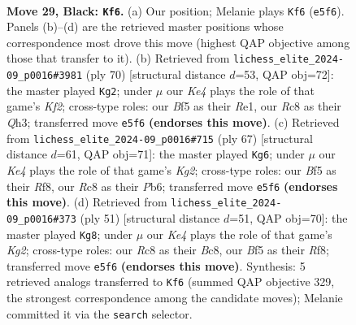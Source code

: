\documentclass[11pt]{article}
\begin{document}
\clearpage

\begin{figure}[p]\centering
\begin{subfigure}{0.46\textwidth}\centering
\resizebox{\linewidth}{!}{%
\newchessgame
\chessboard[
  setfen={1rr5/7p/1p6/p3kb2/7P/N3Q3/PP3PP1/R5K1 b - - 6 29},
  showmover=false,
  pgfstyle=straightmove, color=movearrow, markmove={e5-f6}
]}
\caption{}
\end{subfigure}\hfill
\begin{subfigure}{0.46\textwidth}\centering
\resizebox{\linewidth}{!}{%
\newchessgame
\chessboard[
  setfen={2r5/p4k2/1p2pp2/8/3n1qP1/7Q/PP3K2/4R1R1 w - - 1 36},
  showmover=false,
  pgfstyle=straightmove, color=movearrow, markmove={f2-g2}
]}
\caption{}
\end{subfigure}
\\[4pt]
\begin{subfigure}{0.46\textwidth}\centering
\resizebox{\linewidth}{!}{%
\newchessgame
\chessboard[
  setfen={3r1r2/p5k1/1p6/3pQ3/8/4P3/PP3P1P/7K b - - 5 34},
  showmover=false,
  pgfstyle=straightmove, color=movearrow, markmove={g7-g6}
]}
\caption{}
\end{subfigure}\hfill
\begin{subfigure}{0.46\textwidth}\centering
\resizebox{\linewidth}{!}{%
\newchessgame
\chessboard[
  setfen={2b2r2/pr4k1/1p6/4Q3/4R3/P7/1P3P1P/6K1 b - - 0 26},
  showmover=false,
  pgfstyle=straightmove, color=movearrow, markmove={g7-g8}
]}
\caption{}
\end{subfigure}
\caption{\textbf{Move 29, Black: \texttt{Kf6}.} (a) Our position; Melanie plays \texttt{Kf6} (\texttt{e5f6}). Panels (b)--(d) are the retrieved master positions whose correspondence most drove this move (highest QAP objective among those that transfer to it). (b) Retrieved from \texttt{lichess\_elite\_2024-09\_p0016\#3981} (ply 70) [structural distance $d$=53, QAP obj=72]: the master played \texttt{Kg2}; under $\mu$ our \emph{Ke4} plays the role of that game's \emph{Kf2}; cross-type roles: our \emph{B}f5 as their \emph{R}e1, our \emph{R}c8 as their \emph{Q}h3; transferred move \texttt{e5f6} \textbf{(endorses this move)}. (c) Retrieved from \texttt{lichess\_elite\_2024-09\_p0016\#715} (ply 67) [structural distance $d$=61, QAP obj=71]: the master played \texttt{Kg6}; under $\mu$ our \emph{Ke4} plays the role of that game's \emph{Kg2}; cross-type roles: our \emph{B}f5 as their \emph{R}f8, our \emph{R}c8 as their \emph{P}b6; transferred move \texttt{e5f6} \textbf{(endorses this move)}. (d) Retrieved from \texttt{lichess\_elite\_2024-09\_p0016\#373} (ply 51) [structural distance $d$=51, QAP obj=70]: the master played \texttt{Kg8}; under $\mu$ our \emph{Ke4} plays the role of that game's \emph{Kg2}; cross-type roles: our \emph{R}c8 as their \emph{B}c8, our \emph{B}f5 as their \emph{R}f8; transferred move \texttt{e5f6} \textbf{(endorses this move)}. Synthesis: 5 retrieved analogs transferred to \texttt{Kf6} (summed QAP objective 329, the strongest correspondence among the candidate moves); Melanie committed it via the \texttt{search} selector.}
\label{fig:thought-m57}
\end{figure}
\end{document}
